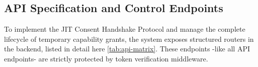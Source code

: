 
\subsection{API Specification and Control Endpoints}

To implement the JIT Consent Handshake Protocol and manage the complete lifecycle of temporary capability grants, 
the system exposes structured routers in the backend, listed in detail here \ref{tab:api-matrix}. 
These endpoints -like all API endpoints- are strictly protected by token verification middleware.

